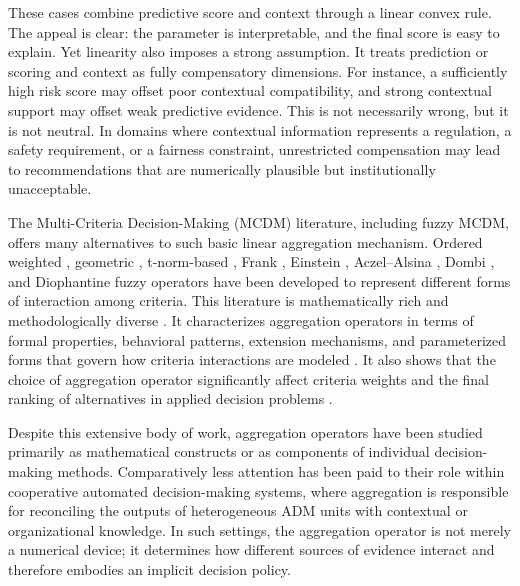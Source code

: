 \documentclass[mathematics,article,submit,moreauthors]{Definitions/mdpi}
\begin{document}

These cases combine predictive score and context through a linear convex rule. The appeal is clear: the parameter is interpretable, and the final score is easy to explain. Yet linearity also imposes a strong assumption. It treats prediction or scoring and context as fully compensatory dimensions. For instance, a sufficiently high risk score may offset poor contextual compatibility, and strong contextual support may offset weak predictive evidence. This is not necessarily wrong, but it is not neutral. In domains where contextual information represents a regulation, a safety requirement, or a fairness constraint, unrestricted compensation may lead to recommendations that are numerically plausible but institutionally unacceptable.

The Multi-Criteria Decision-Making (MCDM) literature, including fuzzy MCDM, offers many alternatives to such basic linear aggregation mechanism. Ordered weighted \citep{Yager1988}, geometric \citep{Tan2009}, t-norm-based \citep{Grabisch1996}, Frank \citep{Riaz2022}, Einstein \citep{Iampan2021}, Aczel--Alsina \citep{Senapati2022}, Dombi \citep{Akram2020}, and Diophantine fuzzy \citep{Farid2022,Jeevitha2023} operators have been developed to represent different forms of interaction among criteria. 
{\color{blue}
This literature is mathematically rich and methodologically diverse \citep{Mardani2018,Sun2018,Kahraman2015,Mardani2015}. It characterizes aggregation operators in terms of formal properties, behavioral patterns, extension mechanisms, and parameterized forms that govern how criteria interactions are modeled \citep{Sun2018}. It also shows that the choice of aggregation operator significantly affect criteria weights and the final ranking of alternatives in applied decision problems \citep{Petrovic2023}.
}

Despite this extensive body of work, aggregation operators have been studied primarily as mathematical constructs or as components of individual decision-making methods. Comparatively less attention has been paid to their role within cooperative automated decision-making systems, where aggregation is responsible for reconciling the outputs of heterogeneous ADM units with contextual or organizational knowledge. In such settings, the aggregation operator is not merely a numerical device; it determines how different sources of evidence interact and therefore embodies an implicit decision policy.
\end{document}
